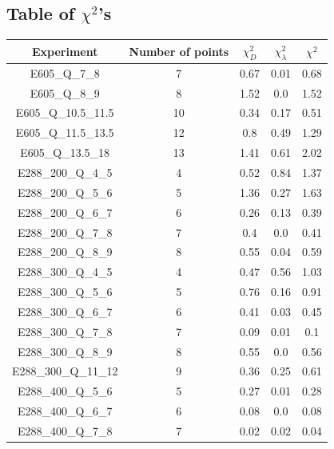 \documentclass[
]{article}
\begin{document}
\hypertarget{table-of-chi2s}{%
\subsection{\texorpdfstring{Table of
\(\chi^2\)'s}{Table of \textbackslash chi\^{}2's}}\label{table-of-chi2s}}

\begin{table}[h]

\centering

\begin{tabular}{|c|c|c|c|c|} \hline

\textbf{Experiment} & \textbf{Number of
points} & \textbf{\(\chi_{D}^2\)} & \textbf{\(\chi_{\lambda}^2\)} & \textbf{\(\chi^2\)} \\ \hline

E605\_Q\_7\_8 & 7 & 0.67 & 0.01 & 0.68 \\ \hline
E605\_Q\_8\_9 & 8 & 1.52 & 0.0 & 1.52 \\ \hline
E605\_Q\_10.5\_11.5 & 10 & 0.34 & 0.17 & 0.51 \\ \hline
E605\_Q\_11.5\_13.5 & 12 & 0.8 & 0.49 & 1.29 \\ \hline
E605\_Q\_13.5\_18 & 13 & 1.41 & 0.61 & 2.02 \\ \hline
E288\_200\_Q\_4\_5 & 4 & 0.52 & 0.84 & 1.37 \\ \hline
E288\_200\_Q\_5\_6 & 5 & 1.36 & 0.27 & 1.63 \\ \hline
E288\_200\_Q\_6\_7 & 6 & 0.26 & 0.13 & 0.39 \\ \hline
E288\_200\_Q\_7\_8 & 7 & 0.4 & 0.0 & 0.41 \\ \hline
E288\_200\_Q\_8\_9 & 8 & 0.55 & 0.04 & 0.59 \\ \hline
E288\_300\_Q\_4\_5 & 4 & 0.47 & 0.56 & 1.03 \\ \hline
E288\_300\_Q\_5\_6 & 5 & 0.76 & 0.16 & 0.91 \\ \hline
E288\_300\_Q\_6\_7 & 6 & 0.41 & 0.03 & 0.45 \\ \hline
E288\_300\_Q\_7\_8 & 7 & 0.09 & 0.01 & 0.1 \\ \hline
E288\_300\_Q\_8\_9 & 8 & 0.55 & 0.0 & 0.56 \\ \hline
E288\_300\_Q\_11\_12 & 9 & 0.36 & 0.25 & 0.61 \\ \hline
E288\_400\_Q\_5\_6 & 5 & 0.27 & 0.01 & 0.28 \\ \hline
E288\_400\_Q\_6\_7 & 6 & 0.08 & 0.0 & 0.08 \\ \hline
E288\_400\_Q\_7\_8 & 7 & 0.02 & 0.02 & 0.04 \\ \hline

\end{tabular}
\end{table}
\end{document}
